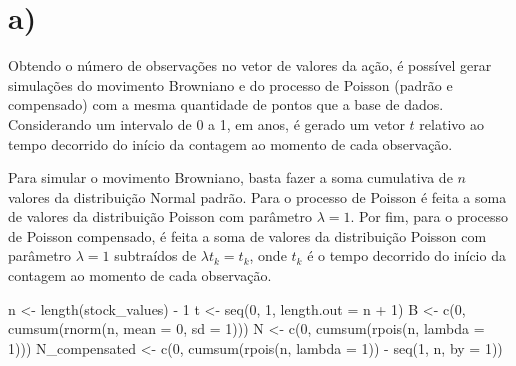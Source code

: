 \documentclass[
  letterpaper,
  DIV=11,
  numbers=noendperiod]{scrreprt}
\newenvironment{Shaded}{\begin{snugshade}}{\end{snugshade}}
\newcommand{\AttributeTok}[1]{\textcolor[rgb]{0.40,0.45,0.13}{#1}}
\newcommand{\DecValTok}[1]{\textcolor[rgb]{0.68,0.00,0.00}{#1}}
\newcommand{\FunctionTok}[1]{\textcolor[rgb]{0.28,0.35,0.67}{#1}}
\newcommand{\NormalTok}[1]{\textcolor[rgb]{0.00,0.23,0.31}{#1}}
\newcommand{\OtherTok}[1]{\textcolor[rgb]{0.00,0.23,0.31}{#1}}
\newcommand{\SpecialCharTok}[1]{\textcolor[rgb]{0.37,0.37,0.37}{#1}}
\begin{document}
\hypertarget{a-1}{%
\section*{a)}\label{a-1}}


Obtendo o número de observações no vetor de valores da ação, é possível
gerar simulações do movimento Browniano e do processo de Poisson (padrão
e compensado) com a mesma quantidade de pontos que a base de dados.
Considerando um intervalo de 0 a 1, em anos, é gerado um vetor \(t\)
relativo ao tempo decorrido do início da contagem ao momento de cada
observação.

Para simular o movimento Browniano, basta fazer a soma cumulativa de
\(n\) valores da distribuição Normal padrão. Para o processo de Poisson
é feita a soma de valores da distribuição Poisson com parâmetro
\(\lambda=1\). Por fim, para o processo de Poisson compensado, é feita a
soma de valores da distribuição Poisson com parâmetro \(\lambda=1\)
subtraídos de \(\lambda t_{k} = t_{k}\), onde \(t_{k}\) é o tempo
decorrido do início da contagem ao momento de cada observação.

\begin{Shaded}
\begin{Highlighting}[]
\NormalTok{n }\OtherTok{\textless{}{-}} \FunctionTok{length}\NormalTok{(stock\_values) }\SpecialCharTok{{-}} \DecValTok{1}
\NormalTok{t }\OtherTok{\textless{}{-}} \FunctionTok{seq}\NormalTok{(}\DecValTok{0}\NormalTok{, }\DecValTok{1}\NormalTok{, }\AttributeTok{length.out =}\NormalTok{ n }\SpecialCharTok{+} \DecValTok{1}\NormalTok{)}
\NormalTok{B }\OtherTok{\textless{}{-}} \FunctionTok{c}\NormalTok{(}\DecValTok{0}\NormalTok{, }\FunctionTok{cumsum}\NormalTok{(}\FunctionTok{rnorm}\NormalTok{(n, }\AttributeTok{mean =} \DecValTok{0}\NormalTok{, }\AttributeTok{sd =} \DecValTok{1}\NormalTok{)))}
\NormalTok{N }\OtherTok{\textless{}{-}} \FunctionTok{c}\NormalTok{(}\DecValTok{0}\NormalTok{, }\FunctionTok{cumsum}\NormalTok{(}\FunctionTok{rpois}\NormalTok{(n, }\AttributeTok{lambda =} \DecValTok{1}\NormalTok{)))}
\NormalTok{N\_compensated }\OtherTok{\textless{}{-}} \FunctionTok{c}\NormalTok{(}\DecValTok{0}\NormalTok{, }\FunctionTok{cumsum}\NormalTok{(}\FunctionTok{rpois}\NormalTok{(n, }\AttributeTok{lambda =} \DecValTok{1}\NormalTok{)) }\SpecialCharTok{{-}} \FunctionTok{seq}\NormalTok{(}\DecValTok{1}\NormalTok{, n, }\AttributeTok{by =} \DecValTok{1}\NormalTok{))}
\end{Highlighting}
\end{Shaded}
\end{document}
